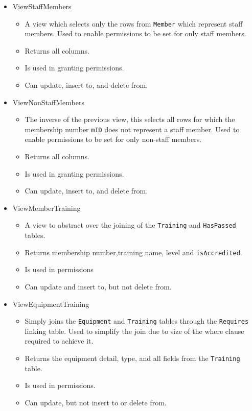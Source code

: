 \documentclass[a4paper, titlepage]{article}
\begin{document}
\begin{itemize}
	\item ViewStaffMembers
	\begin{itemize}
		\item A view which selects only the rows from \texttt{Member} which represent staff members. Used to enable permissions to be set for only staff members.
		\item Returns all columns.
		\item Is used in granting permissions.
		\item Can update, insert to, and delete from.
	\end{itemize}
	\item ViewNonStaffMembers
	\begin{itemize}
		\item The inverse of the previous view, this selects all rows for which the membership number \texttt{mID} does not represent a staff member. Used to enable permissions to be set for only non-staff members.
		\item Returns all columns.
		\item Is used in granting permissions.
		\item Can update, insert to, and delete from.
	\end{itemize}
	\item ViewMemberTraining
	\begin{itemize}
		\item A view to abstract over the joining of the \texttt{Training} and \texttt{HasPassed} tables.
		\item Returns membership number,training name, level and \texttt{isAccredited}.
		\item Is used in permissions
		\item Can update and insert to, but not delete from. 
	\end{itemize}
	\item ViewEquipmentTraining
	\begin{itemize}
		\item Simply joins the \texttt{Equipment} and \texttt{Training} tables through the \texttt{Requires} linking table. Used to simplify the join due to size of the where clause required to achieve it.
		\item Returns the equipment detail, type, and all fields from the \texttt{Training} table.
		\item Is used in permissions.
		\item Can update, but not insert to or delete from.

\end{itemize}
\end{itemize}
\end{document}
